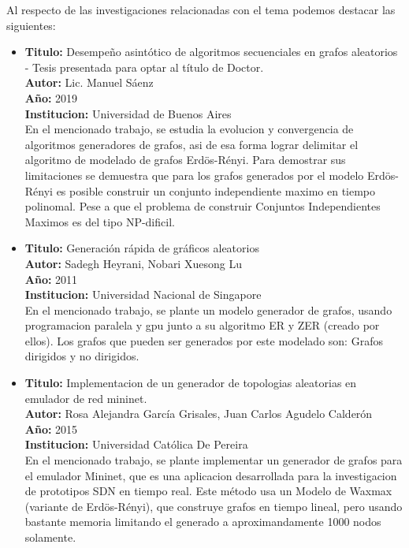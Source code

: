 \documentclass[11pt]{extarticle}
\begin{document}
Al respecto de las investigaciones relacionadas con el tema podemos destacar las siguientes:

\begin{itemize}
  \item \textbf{Titulo:} Desempeño asintótico de algoritmos secuenciales
  en grafos aleatorios - Tesis presentada para optar al título de Doctor.\\
  \textbf{Autor:} Lic. Manuel Sáenz \\
  \textbf{A\~no:} 2019\\
  \textbf{Institucion:} Universidad de Buenos Aires\\
  En el mencionado trabajo, se estudia la evolucion y convergencia de algoritmos
  generadores de grafos, asi de esa forma lograr delimitar el algoritmo de modelado 
  de grafos Erdös-Rényi. Para demostrar sus limitaciones se demuestra que para los grafos
  generados por el modelo Erdös-Rényi es posible construir un conjunto independiente  maximo
  en tiempo polinomal. Pese a que el problema de construir Conjuntos Independientes Maximos es
  del tipo NP-dificil.

\end{itemize}

\begin{itemize}
  \item \textbf{Titulo:} Generación rápida de gráficos aleatorios\\
  \textbf{Autor:} Sadegh Heyrani, Nobari Xuesong Lu \\
  \textbf{A\~no:} 2011\\
  \textbf{Institucion:} Universidad Nacional de Singapore\\
  En el mencionado trabajo, se plante un modelo generador de grafos, usando programacion
  paralela y gpu junto a su algoritmo ER y ZER (creado por ellos). Los grafos que pueden ser
  generados por este modelado son: Grafos dirigidos y no dirigidos.
\end{itemize}

\begin{itemize}
  \item \textbf{Titulo:} Implementacion de un generador de topologias aleatorias en emulador de red mininet.\\
  \textbf{Autor:} Rosa Alejandra García Grisales, Juan Carlos Agudelo Calderón\\
  \textbf{A\~no:} 2015\\
  \textbf{Institucion:} Universidad Católica De Pereira\\
  En el mencionado trabajo, se plante implementar un generador de grafos para el emulador Mininet, que es 
  una aplicacion desarrollada para la investigacion de prototipos SDN en tiempo real.
  Este m\'etodo usa un Modelo de Waxmax (variante de Erdös-Rényi), que construye grafos en tiempo lineal, 
  pero usando bastante memoria limitando el generado a aproximandamente 1000 nodos solamente.
\end{itemize}
\end{document}
